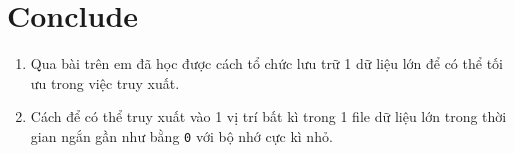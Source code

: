 \documentclass[a4paper]{article}
\theoremstyle{definition}
\begin{document}
\section{Conclude}
\begin{enumerate}[]
  \item Qua bài trên em đã học được cách tổ chức lưu trữ 1 dữ liệu lớn để có thể tối ưu trong việc truy xuất.
  \item Cách để có thể truy xuất vào 1 vị trí bất kì trong 1 file dữ liệu lớn trong thời gian ngắn gần như bằng \texttt{0} với bộ nhớ cực kì nhỏ.
\end{enumerate}
\end{document}
